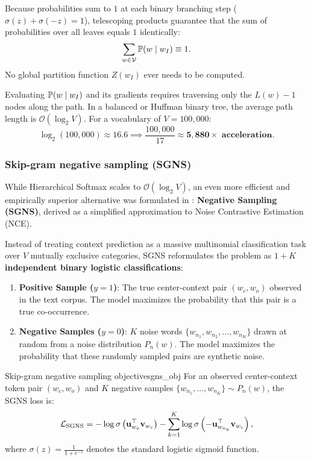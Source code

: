 \documentclass[../../main.tex]{subfiles}
\begin{document}
Because probabilities sum to $1$ at each binary branching step ($\sigma(z) + \sigma(-z) = 1$), telescoping products guarantee that the sum of probabilities over all leaves equals $1$ identically:
\begin{equation}
\label{eq:hierarchical_norm_proof}
\sum_{w \in \mathcal{V}} \mathbb{P}(w \mid w_I) \equiv 1.
\end{equation}
No global partition function $Z(w_I)$ ever needs to be computed.


Evaluating $\mathbb{P}(w \mid w_I)$ and its gradients requires traversing only the $L(w) - 1$ nodes along the path. In a balanced or Huffman binary tree, the average path length is $\mathcal{O}(\log_2 V)$. For a vocabulary of $V = 100{,}000$:
\begin{equation}
\label{eq:hierarchical_speedup}
\log_2(100{,}000) \approx 16.6 \implies \frac{100{,}000}{17} \approx \mathbf{5{,}880\times \text{ acceleration}}.
\end{equation}

\subsubsection{Skip-gram negative sampling (SGNS)}
\label{subsec:sgns_formulation}

While Hierarchical Softmax scales to $\mathcal{O}(\log_2 V)$, an even more efficient and empirically superior alternative was formulated in \cite{mikolov2013distributed}: \textbf{Negative Sampling (SGNS)}, derived as a simplified approximation to Noise Contrastive Estimation (NCE).

Instead of treating context prediction as a massive multinomial classification task over $V$ mutually exclusive categories, SGNS reformulates the problem as \textbf{$1 + K$ independent binary logistic classifications}:
\begin{enumerate}
    \item \textbf{Positive Sample ($y = 1$)}: The true center-context pair $(w_c, w_o)$ observed in the text corpus. The model maximizes the probability that this pair is a true co-occurrence.
    \item \textbf{Negative Samples ($y = 0$)}: $K$ noise words $\{w_{n_1}, w_{n_2}, \dots, w_{n_K}\}$ drawn at random from a noise distribution $P_n(w)$. The model maximizes the probability that these randomly sampled pairs are synthetic noise.
\end{enumerate}

\begin{definition}{Skip-gram negative sampling objective}{sgns_obj}
For an observed center-context token pair $(w_c, w_o)$ and $K$ negative samples $\{w_{n_1}, \dots, w_{n_K}\} \sim P_n(w)$, the SGNS loss is:
\begin{equation}
\label{eq:sgns_loss_display}
\mathcal{L}_{\text{SGNS}} = -\log \sigma\left( \mathbf{u}_{w_o}^\top \mathbf{v}_{w_c} \right) - \sum_{k=1}^K \log \sigma\left( -\mathbf{u}_{w_{n_k}}^\top \mathbf{v}_{w_c} \right),
\end{equation}
where $\sigma(z) = \frac{1}{1 + e^{-z}}$ denotes the standard logistic sigmoid function.
\end{definition}
\end{document}
